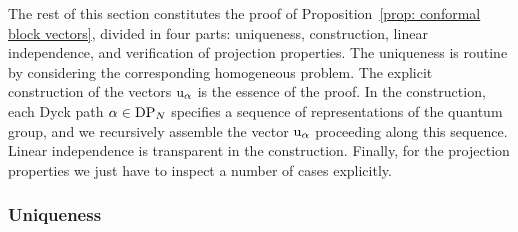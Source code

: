 \documentclass[oneside,english]{amsart}
\numberwithin{equation}{section}
\numberwithin{figure}{section}
\theoremstyle{plain}
\theoremstyle{plain}
\theoremstyle{plain}
\theoremstyle{remark}
\theoremstyle{plain}
\theoremstyle{plain}
\theoremstyle{plain}
\theoremstyle{plain}
\theoremstyle{plain}
\theoremstyle{plain}
\theoremstyle{plain}
\theoremstyle{plain}
\newcommand{\blue}[1]{{\color{blue} #1}}
\newcommand{\red}[1]{{\color{red} #1}}
\begin{document}
The rest of this section constitutes the proof of Proposition~\ref{prop: conformal block vectors},
divided in four parts: uniqueness, construction, linear independence, and verification of
projection properties. %
The uniqueness is routine by considering the corresponding homogeneous problem.
The explicit construction of the vectors $\mathrm{u}_\alpha$ is the essence of the proof.
In the construction, each Dyck path $\alpha \in \mathrm{DP}_N$
specifies a sequence of representations of the quantum group,
and we recursively assemble the vector $\mathrm{u}_\alpha$ proceeding along this sequence.
Linear independence is transparent in the construction. Finally, for the projection properties
we just have to inspect a number of cases explicitly.





\subsubsection{\textbf{Uniqueness}}
\end{document}
